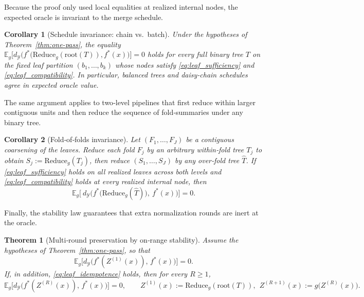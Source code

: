 \documentclass[11pt]{article}
\newtheorem{theorem}{Theorem}
\newtheorem{corollary}{Corollary}
\newcommand{\Y}{\mathcal{Y}}               %
\newcommand{\fstar}{f^*}               %
\newcommand{\E}{\mathbb{E}}
\newcommand{\metric}{d_{\Y}}
\newcommand{\reduce}{\text{Reduce}}
\newcommand{\reduceg}{\reduce_g}
\newcommand{\Eg}{\E_g}     %
\begin{document}
Because the proof only used local equalities at realized internal nodes, the expected oracle is invariant to the merge schedule.

\begin{corollary}[Schedule invariance: chain vs.\ batch]\label{cor:schedule}
Under the hypotheses of Theorem~\ref{thm:one-pass}, the equality
$\Eg\big[\metric\big(\fstar(\reduceg(\mathrm{root}(T)),\fstar(x)\big)\big] = 0$
holds for \emph{every} full binary tree $T$ on the fixed leaf partition $(b_1,\ldots,b_k)$ whose nodes satisfy \eqref{eq:leaf_sufficiency} and \eqref{eq:leaf_compatibility}. In particular, balanced trees and daisy‑chain schedules agree in expected oracle value.
\end{corollary}

The same argument applies to two‑level pipelines that first reduce within larger contiguous units and then reduce the sequence of fold‑summaries under any binary tree.

\begin{corollary}[Fold‑of‑folds invariance]\label{cor:folds}
Let $(F_1,\ldots,F_J)$ be a contiguous coarsening of the leaves. Reduce each fold $F_j$ by an arbitrary within‑fold tree $T_j$ to obtain $S_j:=\reduceg(T_j)$, then reduce $(S_1,\ldots,S_J)$ by any over‑fold tree $\widehat T$. If \eqref{eq:leaf_sufficiency} holds on all realized leaves across both levels and \eqref{eq:leaf_compatibility} holds at every realized internal node, then
\[
\Eg\!\big[\ \metric\big(\fstar\big(\reduceg(\widehat T)\big),\ \fstar(x)\big)\big] = 0.
\]
\end{corollary}

Finally, the stability law guarantees that extra normalization rounds are inert at the oracle.

\begin{theorem}[Multi‑round preservation by on‑range stability]\label{thm:multi-round}
Assume the hypotheses of Theorem~\ref{thm:one-pass}, so that
\[
\Eg\Big[\metric\big(\fstar(Z^{(1)}(x)),\,\fstar(x)\big)\Big]=0.
\]
If, in addition, \ref{eq:leaf_idempotence} holds, then for every $R\ge 1$,
\[
\Eg\Big[\metric\big(\fstar(Z^{(R)}(x)),\,\fstar(x)\big)\Big]=0,
\qquad
Z^{(1)}(x):=\reduceg(\mathrm{root}(T)),\ \ Z^{(R+1)}(x):=g\!\big(Z^{(R)}(x)\big).
\]
\end{theorem}
\end{document}
